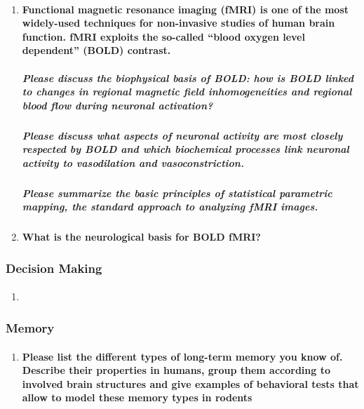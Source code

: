 \documentclass[12pt,article,oneside,a4paper]{memoir}
\begin{document}
\begin{enumerate}
\item \paragraph{Functional magnetic resonance imaging (fMRI) is one of the most widely-used techniques for non-invasive studies of human brain function.  fMRI exploits the so-called “blood oxygen level dependent” (BOLD) contrast.}
\subparagraph{Please discuss the biophysical basis of BOLD: how is BOLD linked to changes in regional magnetic field inhomogeneities and regional blood flow during neuronal activation?}
\subparagraph{Please discuss what aspects of neuronal activity are most closely respected by BOLD and which biochemical processes link neuronal activity to vasodilation and vasoconstriction.}
\subparagraph{Please summarize the basic principles of statistical parametric mapping, the standard approach to analyzing fMRI images.}

\item \paragraph{What is the neurological basis for BOLD fMRI?}

\end{enumerate}


\subsubsection{Decision Making}
\begin{enumerate}
\item \paragraph{}
\end{enumerate}

\subsubsection{Memory}
\begin{enumerate}
\item \paragraph{Please list the different types of long-term memory you know of. Describe their properties in humans, group them according to involved brain structures and give examples of behavioral tests that allow to model these memory types in rodents}
\end{enumerate}
\end{document}
